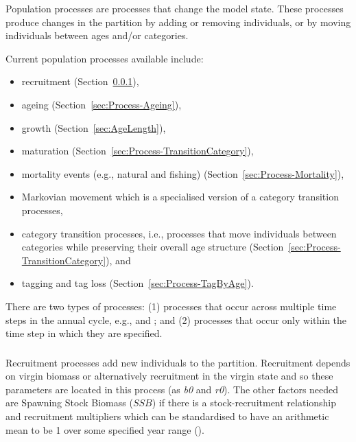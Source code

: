 
Population processes are processes that change the model state. These processes produce changes in the partition by adding or removing individuals, or by moving individuals between ages and/or categories.

Current population processes available include:

\begin{itemize}
\item recruitment (Section~\ref{sec:Process-Recruitment}),
\item ageing (Section~\ref{sec:Process-Ageing}),
\item growth (Section~\ref{sec:AgeLength}),
\item maturation (Section~\ref{sec:Process-TransitionCategory}),
\item mortality events (e.g., natural and fishing) (Section~\ref{sec:Process-Mortality}), 
\item Markovian movement which is a specialised version of a category transition processes, 
\item category transition processes, i.e., processes that move individuals between categories while preserving their overall age structure (Section~\ref{sec:Process-TransitionCategory}), and
\item tagging and tag loss (Section~\ref{sec:Process-TagByAge}).
\end{itemize}

There are two types of processes: (1) processes that occur across multiple time steps in the annual cycle, e.g.,  and ; and (2) processes that occur only within the time step in which they are specified.

\subsubsection{}\label{sec:Process-Recruitment}

Recruitment processes add new individuals to the partition. Recruitment depends on virgin biomass or alternatively recruitment in the virgin state and so these parameters are located in this process (as \textit{b0} and \textit{r0}). The other factors needed are Spawning Stock Biomass ($SSB$) if there is a stock-recruitment relationship and recruitment multipliers which can be standardised to have an arithmetic mean to be 1 over some specified year range ().

